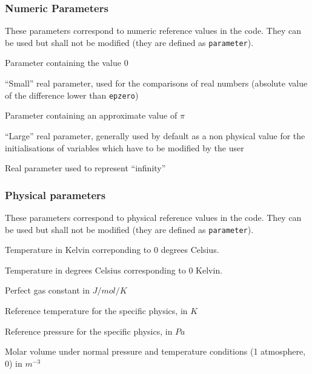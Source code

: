 \subsubsection{Numeric Parameters}

These parameters correspond to numeric reference values in the code.
They can be used but shall not be modified (they are defined as \texttt{parameter}).

{Parameter containing the value 0}

{``Small'' real parameter, used for the comparisons of real numbers (absolute
value of the difference lower than {\tt epzero})}

{Parameter containing an approximate value of $\pi$}

{``Large'' real parameter, generally used by default as a non physical value for
the initialisations of variables which have to be modified by the user}

{Real parameter used to represent ``infinity''}

\subsubsection{Physical parameters}
These parameters correspond to physical reference values in the code.
They can be used but shall not be modified (they are defined as {\tt parameter}).

{Temperature in Kelvin correponding to 0 degrees Celsius.}

{Temperature in degrees Celsius corresponding to 0 Kelvin.}

{Perfect gas constant in $J/mol/K$}

{Reference temperature for the specific physics, in $K$}

{Reference pressure for the specific physics, in $Pa$}

{Molar volume under normal pressure and temperature conditions (1 atmosphere,
0\degresC) in $m^{-3}$}

